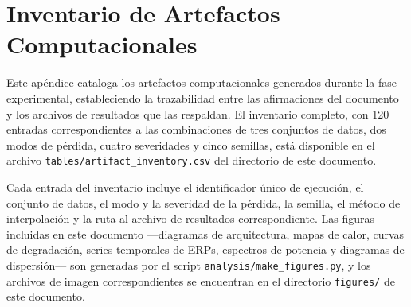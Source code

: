 \chapter{Inventario de Artefactos Computacionales}
\label{ap:inventario}

Este apéndice cataloga los artefactos computacionales generados durante la fase experimental, estableciendo la trazabilidad entre las afirmaciones del documento y los archivos de resultados que las respaldan. El inventario completo, con 120 entradas correspondientes a las combinaciones de tres conjuntos de datos, dos modos de pérdida, cuatro severidades y cinco semillas, está disponible en el archivo \texttt{tables/artifact\_inventory.csv} del directorio de este documento.

Cada entrada del inventario incluye el identificador único de ejecución, el conjunto de datos, el modo y la severidad de la pérdida, la semilla, el método de interpolación y la ruta al archivo de resultados correspondiente. Las figuras incluidas en este documento —diagramas de arquitectura, mapas de calor, curvas de degradación, series temporales de ERPs, espectros de potencia y diagramas de dispersión— son generadas por el script \texttt{analysis/make\_figures.py}, y los archivos de imagen correspondientes se encuentran en el directorio \texttt{figures/} de este documento.